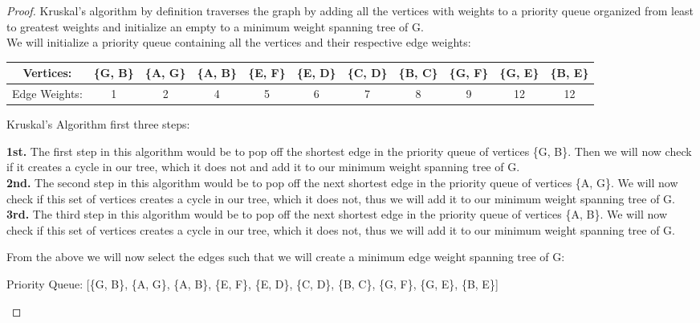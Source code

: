 \documentclass[11pt]{article}
\theoremstyle{definition}
\theoremstyle{definition}
\theoremstyle{definition}
\begin{document}
\begin{proof}
Kruskal's algorithm by definition traverses the graph by adding all the vertices with weights to a priority queue organized from least to greatest weights and initialize an empty to a minimum weight spanning tree of G. \\
We will initialize a priority queue containing all the vertices and their respective edge weights:\\
\begin{center}
\begin{tabular}{ | c | c | c | c | c | c | c | c | c | c | c |}
 \hline
 Vertices:& \{G, B\} & \{A, G\} & \{A, B\} & \{E, F\} & \{E, D\} & \{C, D\} & \{B, C\} & \{G, F\} & \{G, E\} & \{B, E\}\\ 
 \hline
 Edge Weights:& 1 & 2 & 4 & 5 & 6 & 7 & 8 & 9 & 12 & 12\\  
 \hline
\end{tabular}
\end{center}

Kruskal's Algorithm first three steps: \\
\begin {center}
\textbf{1st.} The first step in this algorithm would be to pop off the shortest edge in the priority queue of vertices \{G, B\}. Then we will now check if it creates a cycle in our tree, which it does not and add it to our minimum weight spanning tree of G.\\
\textbf{2nd.} The second step in this algorithm would be to pop off the next shortest edge in the priority queue of vertices \{A, G\}. We will now check if this set of vertices creates a cycle in our tree, which it does not, thus we will add it to our minimum weight spanning tree of G. \\
\textbf{3rd.} The third step in this algorithm would be to pop off the next shortest edge in the priority queue of vertices \{A, B\}. We will now check if this set of vertices creates a cycle in our tree, which it does not, thus we will add it to our minimum weight spanning tree of G. \\
\end{center}

From the above we will now select the edges such that we will create a minimum edge weight spanning tree of G:
\begin{center}
Priority Queue: [\{G, B\}, \{A, G\}, \{A, B\}, \{E, F\}, \{E, D\}, \{C, D\}, \{B, C\}, \{G, F\}, \{G, E\}, \{B, E\}]
\end{center}


\end{proof}
\end{document}
